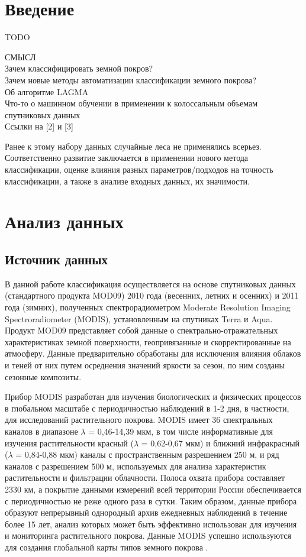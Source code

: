 \documentclass[14pt, a4paper, oneside]{extarticle}
\begin{document}
\tableofcontents
\newpage

\section{Введение}
TODO

СМЫСЛ \\
Зачем классифицировать земной покров? \\
Зачем новые методы автоматизации классификации земного покрова? \\
Об алгоритме LAGMA \\
Что-то о машинном обучении в применении к колоссальным объемам спутниковых данных \\

Ссылки на [2] и [3]

Ранее к этому набору данных случайные леса не применялись всерьез. Соответственно развитие заключается в применении нового метода классификации, оценке влияния разных параметров/подходов на точность классификации, а также в анализе входных данных, их значимости.

\newpage

\section{Анализ данных}
\subsection{Источник данных}
В данной работе классификация осуществляется на основе спутниковых данных (стандартного продукта MOD09) 2010 года (весенних, летних и осенних) и 2011 года (зимних), полученных спектрорадиометром Moderate Resolution Imaging Spectroradiometer (MODIS), установленным на спутниках Terra и Aqua. Продукт MOD09 представляет собой данные о спектрально-отражательных характеристиках земной поверхности, геопривязанные и скорректированные на атмосферу. Данные предварительно обработаны для исключения влияния облаков и теней от них путем осреднения значений яркости за сезон, по ним созданы сезонные композиты.

Прибор MODIS разработан для изучения биологических и физических процессов в глобальном масштабе с периодичностью наблюдений в 1-2 дня, в частности, для исследований растительного покрова. MODIS имеет 36 спектральных каналов в диапазоне $\lambda$ = 0,46-14,39 мкм, в том числе информативные для изучения растительности красный ($\lambda$ = 0,62-0,67 мкм) и ближний инфракрасный ($\lambda$ = 0,84-0,88 мкм) каналы с пространственным разрешением 250 м, и ряд каналов с разрешением 500 м, используемых для анализа характеристик растительности и фильтрации облачности. Полоса охвата прибора составляет 2330 км, а покрытие данными измерений всей территории России обеспечивается с периодичностью не реже одного раза в сутки. Таким образом, данные прибора образуют непрерывный однородный архив ежедневных наблюдений в течение более 15 лет, анализ которых может быть эффективно использован для изучения и мониторинга растительного покрова. Данные MODIS успешно используются для создания глобальной карты типов земного покрова \cite{land-cover-mapping-monograph}.
\end{document}

